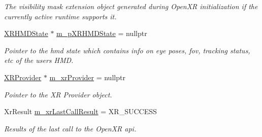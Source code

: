 \begin{DoxyCompactItemize}
\begin{DoxyCompactList}\small\item\em The visibility mask extension object generated during Open\+XR initialization if the currently active runtime supports it. \end{DoxyCompactList}\item 
\mbox{\hyperlink{struct_open_x_r_provider_1_1_x_r_h_m_d_state}{X\+R\+H\+M\+D\+State}} $\ast$ \mbox{\hyperlink{class_open_x_r_provider_1_1_x_r_render_manager_a20ef86e4265f435a761a010700d0e715}{m\+\_\+p\+X\+R\+H\+M\+D\+State}} = nullptr
\begin{DoxyCompactList}\small\item\em Pointer to the hmd state which contains info on eye poses, fov, tracking status, etc of the user\textquotesingle{}s H\+MD. \end{DoxyCompactList}\item 
\mbox{\hyperlink{class_open_x_r_provider_1_1_x_r_provider}{X\+R\+Provider}} $\ast$ \mbox{\hyperlink{class_open_x_r_provider_1_1_x_r_render_manager_a93496eb096c4b871d404db68d01787a8}{m\+\_\+xr\+Provider}} = nullptr
\begin{DoxyCompactList}\small\item\em Pointer to the XR Provider object. \end{DoxyCompactList}\item 
Xr\+Result \mbox{\hyperlink{class_open_x_r_provider_1_1_x_r_render_manager_a85321909f010e4314693433c83c14b2d}{m\+\_\+xr\+Last\+Call\+Result}} = X\+R\+\_\+\+S\+U\+C\+C\+E\+SS
\begin{DoxyCompactList}\small\item\em Results of the last call to the Open\+XR api. \end{DoxyCompactList}\end{DoxyCompactItemize}
